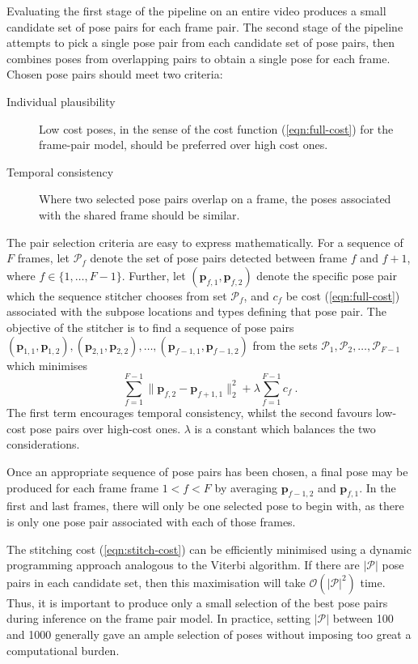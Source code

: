 \documentclass[runningheads]{llncs}
\newcommand{\mat}{\mathbf}
\begin{document}
Evaluating the first stage of the pipeline on an entire video produces a small
candidate set of pose pairs for each frame pair. The second stage of the
pipeline attempts to pick a single pose pair from each candidate set of pose
pairs, then combines poses from overlapping pairs to obtain a single pose for
each frame. Chosen pose pairs should meet two criteria:
%
\begin{description}
\item[Individual plausibility] Low cost poses, in the sense of the cost
function (\ref{eqn:full-cost}) for the frame-pair model, should be preferred over
high cost ones.
\item[Temporal consistency] Where two selected pose pairs overlap on a frame,
the poses associated with the shared frame should be similar.
\end{description}

The pair selection criteria are easy to express mathematically. For a sequence
of $F$ frames, let $\mathcal P_f$ denote the set of pose pairs detected between
frame $f$ and $f + 1$, where $f \in \{1, \ldots, F - 1\}$. Further, let $(\mat
p_{f,1}, \mat p_{f,2})$ denote the specific pose pair which the sequence
stitcher chooses from set $\mathcal P_f$, and $c_f$ be cost
(\ref{eqn:full-cost}) associated with the subpose locations and types defining
that pose pair. The objective of the stitcher is to find a sequence of pose
pairs $(\mat p_{1,1}, \mat p_{1,2}), (\mat p_{2,1}, \mat p_{2,2}), \ldots, (\mat
p_{f-1,1}, \mat p_{f-1,2})$ from the sets $\mathcal P_1, \mathcal P_2, \ldots,
\mathcal P_{F-1}$ which minimises
%
\begin{equation}\label{eqn:stitch-cost}
\sum_{f=1}^{F-1} \|\mat p_{f,2} - \mat p_{f+1,1}\|_2^2
+ \lambda \sum_{f=1}^{F-1} c_f~.
\end{equation}
%
The first term encourages temporal consistency, whilst the second favours
low-cost pose pairs over high-cost ones. $\lambda$ is a constant which balances
the two considerations.

Once an appropriate sequence of pose pairs has been chosen, a final pose may be
produced for each frame frame $1 < f < F$ by averaging $\mat p_{f-1,2}$ and
$\mat p_{f,1}$. In the first and last frames, there will only be one selected
pose to begin with, as there is only one pose pair associated with each of those
frames.

The stitching cost (\ref{eqn:stitch-cost}) can be efficiently minimised using a
dynamic programming approach analogous to the Viterbi algorithm. If there are
$|\mathcal P|$ pose pairs in each candidate set, then this maximisation will
take $\mathcal O(|\mathcal P|^2)$ time. Thus, it is important to produce only a
small selection of the best pose pairs during inference on the frame pair model.
In practice, setting $|\mathcal P|$ between 100 and 1000 generally gave an ample
selection of poses without imposing too great a computational burden.
\end{document}
